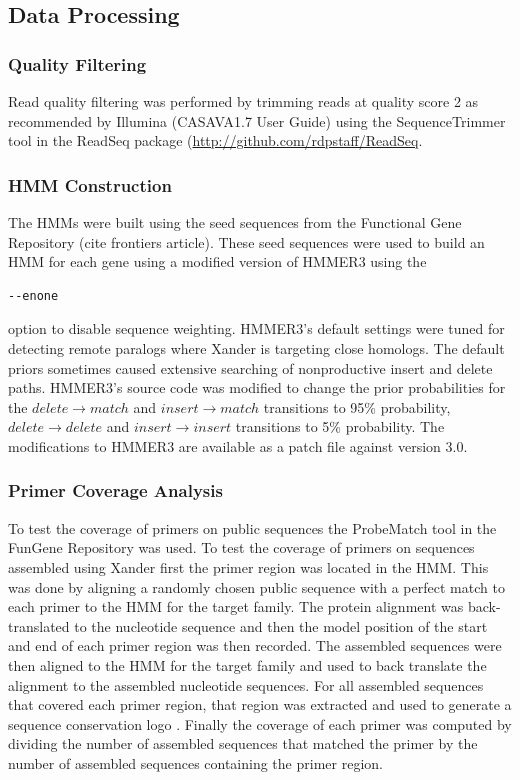 \documentclass[10pt]{bmc_article}
\newenvironment{bmcformat}{\begin{raggedright}\baselineskip20pt\sloppy\setboolean{publ}{false}}{\end{raggedright}\baselineskip20pt\sloppy}
\begin{document}
\begin{bmcformat}
\subsection*{Data Processing}
\subsubsection*{Quality Filtering}
Read quality filtering was performed by trimming reads at quality score 2 as recommended by Illumina (CASAVA1.7 User Guide) using the SequenceTrimmer tool in the ReadSeq package (\url{http://github.com/rdpstaff/ReadSeq}.

\subsubsection*{HMM Construction}
The HMMs were built using the seed sequences from the Functional Gene Repository (cite frontiers article).  These seed sequences were used to build an HMM for each gene using a modified version of HMMER3 using the \begin{verbatim}--enone\end{verbatim} option to disable sequence weighting. HMMER3's default settings were tuned for detecting remote paralogs\cite{johnson_division_2006} where Xander is targeting close homologs.  The default priors sometimes caused extensive searching of nonproductive insert and delete paths. HMMER3's source code was modified to change the prior probabilities for the $delete \rightarrow match$ and $insert \rightarrow match$ transitions to 95\% probability, $delete \rightarrow delete$ and $insert \rightarrow insert$ transitions to 5\% probability.  The modifications to HMMER3 are available as a patch file against version 3.0.

\subsubsection*{Primer Coverage Analysis}
To test the coverage of primers on public sequences the ProbeMatch tool in the FunGene Repository was used.  To test the coverage of primers on sequences assembled using Xander first the primer region was located in the HMM.  This was done by aligning a randomly chosen public sequence with a perfect match to each primer to the HMM for the target family.  The protein alignment was back-translated to the nucleotide sequence and then the model position of the start and end of each primer region was then recorded.  The assembled sequences were then aligned to the HMM for the target family and used to back translate the alignment to the assembled nucleotide sequences.  For all assembled sequences that covered each primer region, that region was extracted and used to generate a sequence conservation logo \cite{schneider_sequence_1990}.  Finally the coverage of each primer was computed by dividing the number of assembled sequences that matched the primer by the number of assembled sequences containing the primer region.


\end{bmcformat}
\end{document}
